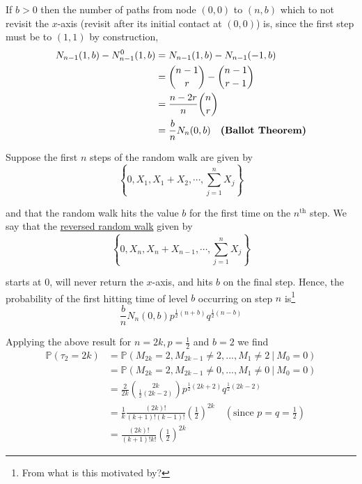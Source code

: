\documentclass[12pt]{article}
\newlength\tindent
\renewcommand{\indent}{\hspace*{\tindent}}
\renewcommand{\P}{\mathbb P}
\begin{document}
\indent If $b > 0$ then the number of paths from node $(0,0)$ to $(n,b)$ which to not revisit the $x$-axis (revisit after its initial contact at $(0,0)$) is, since the first step must be to $(1,1)$ by construction,
\begin{align*}
	N_{n - 1}(1,b) - N^0_{n - 1}(1,b) &= N_{n - 1}(1,b) - N_{n - 1}(-1,b) \\
	&= {{n - 1}\choose{r}} - {{n - 1}\choose{r - 1}} \\
	&= \frac{ n - 2r }{ n } {{n}\choose{r}} \\
	&= \frac{b}{n} N_n(0,b) \quad \text{\bf (Ballot Theorem)}
\end{align*}

Suppose the first $n$ steps of the random walk are given by 
\begin{equation*}
	\left\{0, X_1, X_1 + X_2, \cdots, \sum^n_{j = 1} X_j \right\}
\end{equation*}

and that the random walk hits the value $b$ for the first time on the $n^\text{th}$ step. We say that the \underline{reversed random walk} given by
\begin{equation*}
	\left\{0, X_n, X_n + X_{n - 1}, \cdots, \sum^n_{j = 1} X_j \right\}
\end{equation*}

starts at $0$, will never return the $x$-axis, and hits $b$ on the final step. Hence, the probability of the first hitting time of level $b$ occurring on step $n$ is\footnote{From what is this motivated by?}
\begin{equation*}
	\frac{b}{n}N_n(0,b) p^{\frac{1}{2}(n + b)} q^{\frac{1}{2}(n - b)}
\end{equation*}

Applying the above result for $n = 2k, p = \frac{1}{2}$ and $b = 2$ we find
\begin{align*}
	\P(\tau_2 = 2k) &= \P(M_{2k} = 2, M_{2k - 1} \neq 2,..., M_1 \neq 2~|~M_0 = 0) \\
	&= \P(M_{2k} = 2, M_{2k - 1} \neq 0,..., M_1 \neq 0~|~M_0 = 0) \\
	&= \frac{2}{2k} {{2k}\choose{\frac{1}{2}(2k - 2)}} p^{\frac{1}{2}(2k + 2)} q^{\frac{1}{2}(2k - 2)} \\
	&= \frac{1}{k} \frac{ (2k)! }{ (k + 1)!(k - 1)! } \left( \frac{1}{2} \right)^{2k} \quad \left(\text{since  } p = q = \frac{1}{2}\right) \\
	&= \frac{ (2k)! }{ (k + 1)!k! } \left( \frac{1}{2} \right)^{2k}
\end{align*}
\end{document}
